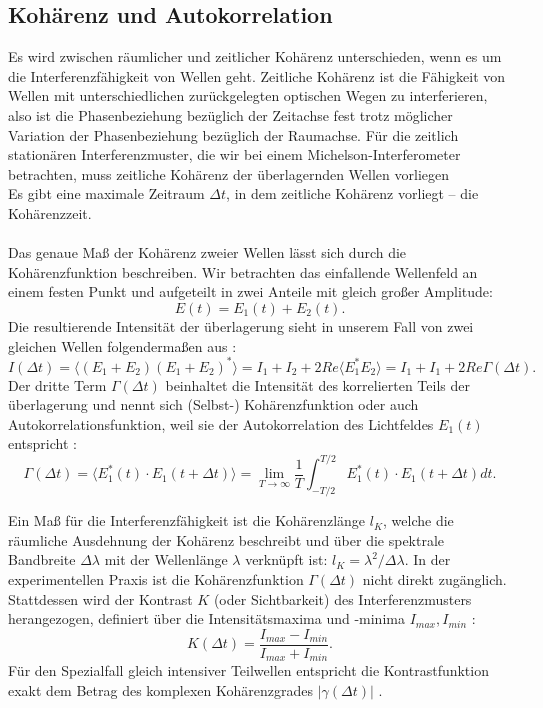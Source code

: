 \documentclass[10pt,a4paper]{article}
\begin{document}
\subsection{Kohärenz und Autokorrelation}
Es wird zwischen räumlicher und zeitlicher Kohärenz unterschieden, wenn es um die Interferenzfähigkeit von Wellen geht. Zeitliche Kohärenz ist die Fähigkeit von Wellen mit unterschiedlichen zurückgelegten optischen Wegen zu interferieren, also ist die Phasenbeziehung bezüglich der Zeitachse fest trotz möglicher Variation der Phasenbeziehung bezüglich der Raumachse. Für die zeitlich stationären Interferenzmuster, die wir bei einem Michelson-Interferometer betrachten, muss zeitliche Kohärenz der überlagernden Wellen vorliegen\\
Es gibt eine maximale Zeitraum $\Delta t$, in dem zeitliche Kohärenz vorliegt -- die Kohärenzzeit.\\\\
Das genaue Maß der Kohärenz zweier Wellen lässt sich durch die Kohärenzfunktion beschreiben.
Wir betrachten das einfallende Wellenfeld an einem festen Punkt und aufgeteilt in zwei Anteile mit gleich großer Amplitude:
$$E(t)=E_1(t)+E_2(t).$$
Die resultierende Intensität der überlagerung sieht in unserem Fall von zwei gleichen Wellen folgendermaßen aus \cite{2}:
\begin{equation}
I(\Delta t)=\langle(E_1+E_2)(E_1+E_2)^*\rangle=I_1+I_2+2Re\langle E^*_1E_2 \rangle =I_1+I_1+2Re\Gamma(\Delta t).
\end{equation}
Der dritte Term $\Gamma(\Delta t)$ beinhaltet die Intensität des korrelierten Teils der überlagerung und nennt sich (Selbst-) Kohärenzfunktion oder auch Autokorrelationsfunktion, weil sie der Autokorrelation des Lichtfeldes $E_1(t)$ entspricht \cite{2}:
\begin{equation}
\Gamma(\Delta t)=\langle E^*_1(t)\cdot E_1(t+\Delta t)\rangle = \lim_{T\to\infty}\frac{1}{T}\int^{T/2}_{-T/2}E^*_1(t)\cdot E_1(t+\Delta t)dt.
\end{equation}

Ein Maß für die Interferenzfähigkeit ist die Kohärenzlänge $l_K$, welche die räumliche Ausdehnung der Kohärenz beschreibt und über die spektrale Bandbreite $\Delta\lambda$ mit der Wellenlänge $\lambda$ verknüpft ist: $l_K = \lambda^2 / \Delta\lambda$. 
In der experimentellen Praxis ist die Kohärenzfunktion $\Gamma(\Delta t)$ nicht direkt zugänglich. Stattdessen wird der Kontrast $K$ (oder Sichtbarkeit) des Interferenzmusters herangezogen, definiert über die Intensitätsmaxima und -minima $I_{max}, I_{min}$ \cite{2}:
\begin{equation}
K(\Delta t) = \frac{I_{max} - I_{min}}{I_{max} + I_{min}}.
\end{equation}
Für den Spezialfall gleich intensiver Teilwellen entspricht die Kontrastfunktion exakt dem Betrag des komplexen Kohärenzgrades $|\gamma(\Delta t)|$ \cite{2}.
\end{document}
